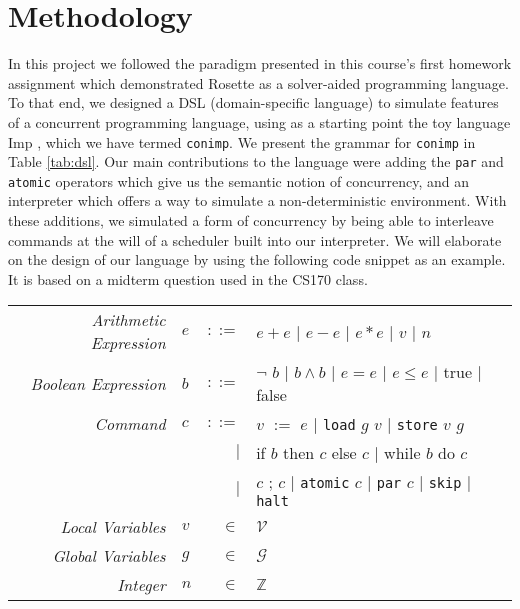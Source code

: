 \section{Methodology}
In this project we followed the paradigm presented in this course's first homework assignment which demonstrated Rosette as a solver-aided programming language.  To that end, we designed a DSL (domain-specific language) to simulate features of a concurrent programming language, using as a starting point the toy language Imp \citep{winskel1993}, which we have termed \texttt{conimp}. We present the grammar for \texttt{conimp} in Table \ref{tab:dsl}. Our main contributions to the language were adding the \texttt{par} and \texttt{atomic} operators which give us the semantic notion of concurrency, and an interpreter which offers a way to simulate a non-deterministic environment.  With these additions, we simulated a form of concurrency by being able to interleave commands at the will of a scheduler built into our interpreter.  We will elaborate on the design of our language by using the following code snippet as an example.  It is based on a midterm question used in the CS170 class.

\begin{table*}[!h]
\centering
\begin{tabular}{ r l r l }
\emph{Arithmetic Expression} & $e$ & $::=$ & $e + e$ 
                                         $|$ $e - e$ 
                                         $|$ $e * e$ 
                                         $|$ $v$ 
                                         $|$ $n$ \\
\emph{Boolean Expression} & $b$ & $::=$ & $\neg$ $b$ 
                                      $|$ $b \wedge b$ 
                                      $|$ $e = e$ 
                                      $|$ $e \leq e$ 
                                      $|$ true 
                                      $|$ false \\
\emph{Command} & $c$ & $::=$ & $v$ $:=$ $e$ 
							 $|$   \texttt{load} $g$ $v$
							 $|$   \texttt{store} $v$ $g$ \\ 
               &     &       $|$ & if $b$ then $c$ else $c$
                             $|$   while $b$ do $c$ \\
               &     &       $|$ & $c$ ; $c$
							 $|$   \texttt{atomic} $c$
							 $|$   \texttt{par} $c$
							 $|$   \texttt{skip}
							 $|$   \texttt{halt} 
                               \\
\emph{Local Variables} & $v$ & $\in$ & $\mathcal{V}$ \\
\emph{Global Variables} & $g$ & $\in$ & $\mathcal{G}$ \\
\emph{Integer} & $n$ & $\in$ & $\mathbb{Z}$ \\
\end{tabular}
\caption{
Concurrent Imp DSL grammar. 
}
\label{tab:dsl}
\end{table*}

